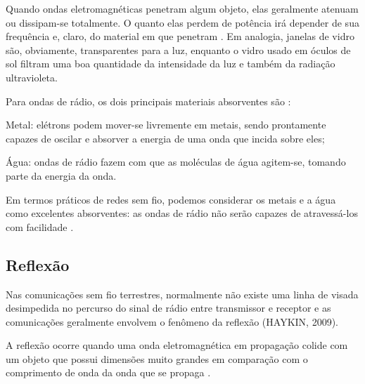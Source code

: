 Quando ondas eletromagnéticas penetram algum objeto, elas geralmente atenuam ou dissipam-se totalmente. O quanto elas perdem de potência irá depender de sua frequência e, claro, do material em que penetram \cite{flickenger2008}. Em analogia, janelas de vidro são, obviamente, transparentes para a luz, enquanto o vidro usado em óculos de sol filtram uma boa quantidade da intensidade da luz e também da radiação ultravioleta. 

\begin{figure}[H]
	\centering
\end{figure}

Para ondas de rádio, os dois principais materiais absorventes são \cite{flickenger2008}:

\begin{alineas}
	\item Metal: elétrons podem mover-se livremente em metais, sendo prontamente capazes de oscilar e absorver a energia de uma onda que incida sobre eles;
	\item Água: ondas de rádio fazem com que as moléculas de água agitem-se, tomando parte da energia da onda.
\end{alineas}

Em termos práticos de redes sem fio, podemos considerar os metais e a água como excelentes absorventes: as ondas de rádio não serão capazes de atravessá-los com facilidade \cite{flickenger2008}.

\subsection{Reflexão}
\label{sub:reflexao}

Nas comunicações sem fio terrestres, normalmente não existe uma linha de visada desimpedida no percurso do sinal de rádio entre transmissor e receptor e as comunicações geralmente envolvem o fenômeno da reflexão (HAYKIN, 2009).

\begin{citacao}
	A reflexão ocorre quando uma onda eletromagnética em propagação colide com um objeto que possui dimensões muito grandes em comparação com o comprimento de onda da onda que se propaga  \cite{rappaport2009}.
\end{citacao}

